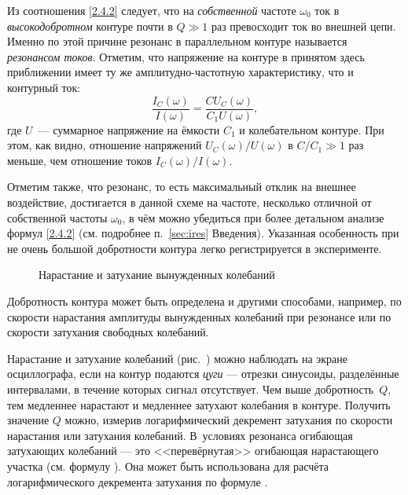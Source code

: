 Из соотношения \eqref{2.4.2} следует, 
что на \emph{собственной} частоте $\omega_0$ ток в \emph{высокодобротном} 
контуре почти в $Q\gg 1$ раз превосходит ток во внешней цепи. 
Именно по этой причине резонанс в параллельном контуре называется 
\emph{резонансом токов}. 
Отметим, что напряжение на контуре в принятом здесь приближении имеет ту 
же амплитудно-частотную характеристику, что и контурный ток:
\[
\frac{I_C(\omega)}{I(\omega)} = \frac{CU_C(\omega)}{C_1 U(\omega)},
\]
где $U$~--- суммарное напряжение на ёмкости $C_1$ и колебательном контуре.
При этом, как видно, отношение напряжений $U_C(\omega)/U(\omega)$ в $C/C_1\gg1$ 
раз меньше, чем отношение токов $I_C(\omega)/I(\omega)$.

Отметим также, что резонанс, то есть максимальный отклик на внешнее воздействие, 
достигается в данной схеме на частоте, несколько отличной от собственной частоты 
$\omega_0$, в чём можно убедиться при более детальном анализе формул \eqref{2.4.2}
(см. подробнее п.~\ref{sec:ires} Введения). 
Указанная особенность при не очень большой добротности контура легко регистрируется 
в эксперименте.



\begin{figure}
    \centering
    \caption{Нарастание и затухание вынужденных колебаний}
\end{figure}

Добротность контура может быть определена и другими способами, например, 
по скорости нарастания амплитуды вынужденных колебаний при резонансе 
или по скорости затухания свободных колебаний. 

Нарастание и затухание 
колебаний (рис.~) можно наблюдать 
на экране осциллографа, если на контур подаются \emph{цуги} --- отрезки 
синусоиды, разделённые интервалами, в течение которых сигнал отсутствует. 
Чем выше добротность~$Q$, тем медленнее 
нарастают и медленнее затухают колебания в контуре. Получить значение $Q$ 
можно, измерив логарифмический декремент затухания по скорости 
нарастания или затухания колебаний. В~условиях резонанса огибающая затухающих 
колебаний --- это <<перевёрнутая>> огибающая нарастающего участка 
(см. формулу ).
Она может быть использована для расчёта логарифмического декремента затухания
по формуле .



